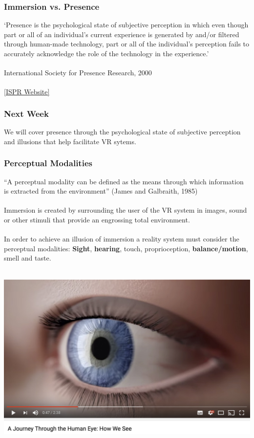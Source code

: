 \begin{frame}
	\frametitle{Immersion vs. Presence}
	
	`Presence is the psychological state of subjective perception in which even though part or all of an individual's current experience is generated by and/or filtered through human-made technology, part or all of the individual's perception fails to accurately acknowledge the role of the technology in the experience.' \\~\\
	
	International Society for Presence Research, 2000
	\\~\\
	\href{http://ispr.info}{[ISPR Website]}	
	
\end{frame}

\begin{frame}
	\frametitle{Next Week}
	We will cover presence through the psychological state of subjective perception and illusions that help facilitate VR sytems.
\end{frame}

\begin{frame}
	\frametitle{Perceptual Modalities}
	
	``A perceptual modality can be defined as the means through which information is extracted from the environment'' (James and Galbraith, 1985) \\~\\
	
	Immersion is created by surrounding the user of the VR system in images, sound or other stimuli that provide an engrossing total environment. \\~\\
	In order to achieve an illusion of immersion a reality system must consider the perceptual modalities: \textbf{Sight}, \textbf{hearing}, touch, proprioception, \textbf{balance/motion}, smell and taste. \\~\\
	
\end{frame}

\begin{frame}
	\begin{center}
		\href{https://www.youtube.com/watch?v=gvozcv8pS3c}{ \includegraphics[scale=.3]{assets/eyetut}  }
	\end{center}
\end{frame}

